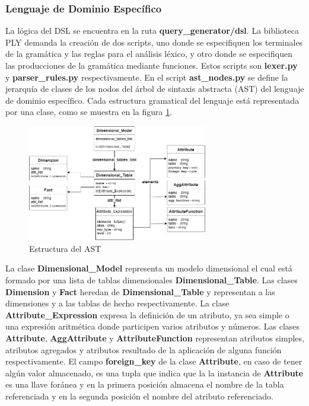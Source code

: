 \subsubsection{Lenguaje de Dominio Espec\'ifico}

La lógica del DSL se encuentra en la ruta \textbf{query\_generator/dsl}. La biblioteca 
PLY demanda la creación de dos scripts, uno donde se especifiquen los terminales de la gramática y las reglas 
para el análisis léxico, y otro donde se especifiquen las producciones de la gramática mediante funciones. Estos 
scripts son \textbf{lexer.py} y \textbf{parser\_rules.py} respectivamente. En el script \textbf{ast\_nodes.py} se define  
la jerarquía de clases de los nodos del \'arbol de sintaxis abstracta (AST) del lenguaje de dominio específico. Cada 
estructura gramatical del lenguaje est\'a representada por una clase, como se muestra en la figura \ref{fig:ast}.

\begin{figure}[htb]
    \centering
    \includegraphics[width=0.7\textwidth]{Graphics/ast.png}
    \caption{Estructura del AST}
    \label{fig:ast}
\end{figure}

La clase \textbf{Dimensional\_Model} representa un modelo dimensional el cual est\'a formado por una lista de tablas 
dimensionales \textbf{Dimensional\_Table}. Las clases \textbf{Dimension} y \textbf{Fact} heredan de \textbf{Dimensional\_Table} 
y representan a las dimensiones y a las tablas de hecho respectivamente. La clase \textbf{Attribute\_Expression} expresa 
la definición de un atributo, ya sea simple o una expresión aritmética donde participen varios atributos y n\'umeros. 
Las clases \textbf{Attribute}, \textbf{AggAttribute} y \textbf{AttributeFunction} representan atributos simples, atributos 
agregados y atributos resultado de la aplicación de alguna función respectivamente. El campo \textbf{foreign\_key} de 
la clase \textbf{Attribute}, en caso de tener alg\'un valor almacenado, es una tupla que indica que la la instancia 
de \textbf{Attribute} es una llave for\'anea y en la primera posición almacena el nombre de la tabla referenciada y 
en la segunda posición el nombre del atributo referenciado.

